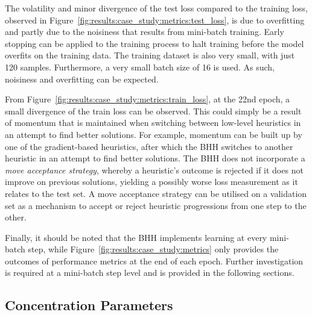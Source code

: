 The volatility and minor divergence of the test loss compared to the training loss, observed in Figure~\ref{fig:results:case_study:metrics:test_loss}, is due to overfitting and partly due to the noisiness that results from mini-batch training. Early stopping can be applied to the training process to halt training before the model overfits on the training data. The training dataset is also very small, with just 120 samples. Furthermore, a very small batch size of 16 is used. As such, noisiness and overfitting can be expected.

From Figure~\ref{fig:results:case_study:metrics:train_loss}, at the 22nd epoch, a small divergence of the train loss can be observed. This could simply be a result of momentum that is maintained when switching between low-level heuristics in an attempt to find better solutions. For example, momentum can be built up by one of the gradient-based heuristics, after which the \acs{BHH} switches to another heuristic in an attempt to find better solutions. The \acs{BHH} does not incorporate a \textit{move acceptance strategy}, whereby a heuristic's outcome is rejected if it does not improve on previous solutions, yielding a possibly worse loss measurement as it relates to the test set. A move acceptance strategy can be utilised on a validation set as a mechanism to accept or reject heuristic progressions from one step to the other.

Finally, it should be noted that the \acs{BHH} implements learning at every mini-batch step, while Figure~\ref{fig:results:case_study:metrics} only provides the outcomes of performance metrics at the end of each epoch. Further investigation is required at a mini-batch step level and is provided in the following sections.



\subsection{Concentration Parameters}\label{sec:results:case_study:concentration_parameters}


